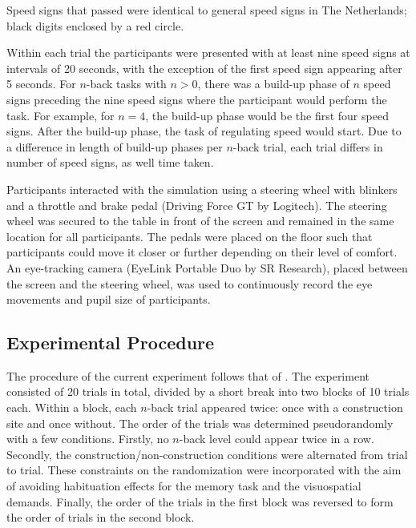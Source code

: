 Speed signs that passed were identical to general speed signs in The Netherlands; black digits enclosed by a red circle. 


Within each trial the participants were presented with at least nine speed signs at intervals of 20 seconds, with the exception of the first speed sign appearing after 5 seconds. 
For \(n\)-back tasks with \(n > 0\), there was a build-up phase of \(n\) speed signs preceding the nine speed signs where the participant would perform the task. 
For example, for \(n = 4\), the build-up phase would be the first four speed signs. 
After the build-up phase, the task of regulating speed would start. 
Due to a difference in length of build-up phases per \(n\)-back trial, each trial differs in number of speed signs, as well time taken.

Participants interacted with the simulation using a steering wheel with blinkers and a throttle and brake pedal (Driving Force GT by Logitech). 
The steering wheel was secured to the table in front of the screen and remained in the same location for all participants. 
The pedals were placed on the floor such that participants could move it closer or further depending on their level of comfort. 
An eye-tracking camera (EyeLink Portable Duo by SR Research), placed between the screen and the steering wheel, was used to continuously record the eye movements and pupil size of participants. 

\subsection{Experimental Procedure}
The procedure of the current experiment follows that of \citet{Scheunemann2019}.
The experiment consisted of 20 trials in total, divided by a short break into two blocks of 10 trials each. 
Within a block, each \(n\)-back trial appeared twice: once with a construction site and once without. 
The order of the trials was determined pseudorandomly with a few conditions. 
Firstly, no \(n\)-back level could appear twice in a row. 
Secondly, the construction/non-construction conditions were alternated from trial to trial. 
These constraints on the randomization were incorporated with the aim of avoiding habituation effects for the memory task and the visuospatial demands. 
Finally, the order of the trials in the first block was reversed to form the order of trials in the second block.

